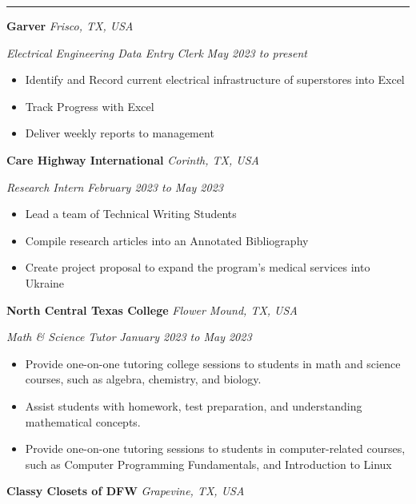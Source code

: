 \documentclass[10pt, a4paper]{article}
\newcommand{\rangesep}{to\xspace}  %
\renewcommand{\date}[1]{\textit{#1}}
\newcommand{\location}[1]{\textit{#1}}
\newcommand{\heading}[1]{
    \makebox[0pt][l]{\Large \sc \hspace{2pt}#1}
    \rule[-0.7ex]{\columnwidth}{0.5pt}\vspace{1.0ex}
}
\newcommand{\subheading}[1]{{\bfseries #1}}
\newcommand{\subheadSkip}{\vspace{0.7ex}}
\newenvironment{mysection}[1]
{\vspace{2.5ex}
\heading{#1}
\begin{adjustwidth}{0.3cm}{0cm}}
{\end{adjustwidth} }
\begin{document}
    \begin{mysection}{Employment}
        \subheading{Garver} \hfill \location{Frisco, TX, USA}

        \textit{Electrical Engineering Data Entry Clerk} \hfill \date{May 2023 \rangesep present}
        \vspace{0.1ex}
        \begin{itemize}
            \item Identify and Record current electrical infrastructure of superstores into Excel
            \item Track Progress with Excel
            \item Deliver weekly reports to management 
        \end{itemize}
        \subheadSkip
        \subheading{Care Highway International} \hfill \location{Corinth, TX, USA}

        \textit{Research Intern} \hfill \date{February 2023 \rangesep May 2023}
        \vspace{0.1ex}
        \begin{itemize}
            \item Lead a team of Technical Writing Students
            \item Compile research articles into an Annotated Bibliography
            \item Create project proposal to expand the program's medical services into Ukraine
        \end{itemize}
        \subheadSkip
        \subheading{North Central Texas College} \hfill \location{Flower Mound, TX, USA}

        \vspace{0.1ex}
        \textit{Math \& Science Tutor} \hfill \date{January 2023 \rangesep May 2023}
        \begin{itemize}
            \item Provide one-on-one tutoring college sessions to students in math and science courses, such as algebra, chemistry, and biology.
            \item Assist students with homework, test preparation, and understanding mathematical concepts.
            \item Provide one-on-one tutoring sessions to students in computer-related courses, such as Computer Programming Fundamentals, and Introduction to Linux 
        \end{itemize}
        \subheadSkip
        \subheading{Classy Closets of DFW} \hfill \location{Grapevine, TX, USA}


\end{mysection}
\end{document}
